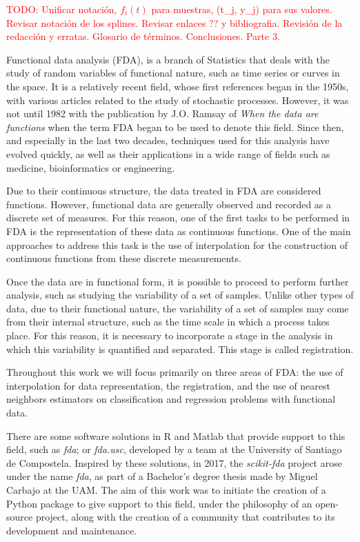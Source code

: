 

\textcolor{red}{TODO: Unificar notación, $f_i(t)$ para muestras, (t_j, y_j) para
sus valores. Revisar notación de los splines. Revisar enlaces ?? y bibliografia.
Revisión de la redacción y erratas. Glosario de términos. Conclusiones. Parte 3.}

Functional data analysis (FDA), is a branch of
Statistics that deals with the study of random variables of
functional nature, such as time series or curves in the
space. It is a relatively recent field, whose first references
began in the 1950s, with various articles related to the study of stochastic
processes. However, it was not until 1982 with the publication by
J.O. Ramsay of \textit{When the data are functions}\cite{Ramsay1982} when the
term FDA began to be used to denote this field.
Since then, and especially in the last two decades, techniques used for this analysis
have evolved quickly, as well as their applications in a wide range of fields
such as medicine, bioinformatics or engineering.

Due to their continuous structure, the data treated in FDA are considered functions.
However, functional data are generally observed and recorded as a discrete set of
measures. For this reason, one of the first tasks to be performed in FDA is the
representation of these data as continuous functions.
One of the main approaches to address this task is the use of interpolation
for the construction of continuous functions from these discrete measurements.

Once the data are in functional form, it is possible to proceed to perform
further analysis, such as studying the variability of a set of samples.
Unlike other types of data, due to their functional nature, the variability of
a set of samples may come from their internal structure, such as the time scale
in which a process takes place. For this reason, it is necessary to
incorporate a stage in the analysis in which this variability is quantified
and separated. This stage is called registration.

Throughout this work we will focus primarily on three areas of FDA:
the use of interpolation for data representation, the registration, and the use
of nearest neighbors estimators on classification and regression problems with
functional data.

There are some software solutions in R and Matlab that provide support to this
field, such as \textit{fda}\cite{fda-r}\cite{Ramsay2009};
or \textit{fda.usc}\cite{FdaUsc}, developed by a team at the
University of Santiago de Compostela.
Inspired by these solutions, in 2017, the \textit{scikit-fda} project arose
under the name \textit{fda}\cite{FDA2018}, as part of a Bachelor's degree thesis
made by Miguel Carbajo at the UAM. The aim of this work was to initiate the creation of a
Python package to give support to this field, under the philosophy of an open-source
project, along with the creation of a community that contributes to its development
and maintenance.

